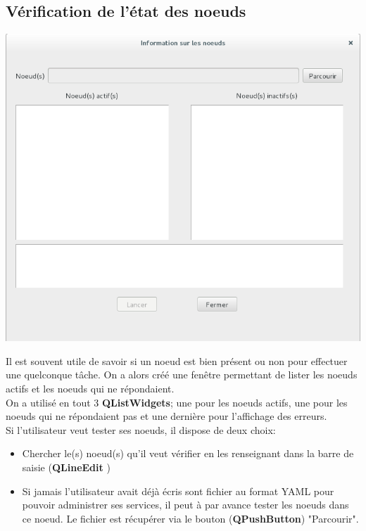 \documentclass[a4paper,11pt]{article}
\begin{document}
\subsection{Vérification de l'état des noeuds}

\begin{center}
\includegraphics[scale=0.6]{fen_etat_noeud.png} 
\end{center}

Il est souvent utile de savoir si un noeud est bien présent ou non pour effectuer une quelconque tâche. On a alors créé une fenêtre permettant de lister les noeuds actifs et les noeuds qui ne répondaient.\\
On a utilisé en tout 3 \textbf{QListWidgets}; une pour les noeuds actifs, une pour les noeuds qui ne répondaient pas et une dernière pour l'affichage des erreurs.\\
Si l'utilisateur veut tester ses noeuds, il dispose de deux choix:
\begin{itemize}
 \item Chercher le(s) noeud(s) qu'il veut vérifier en les renseignant dans la barre de saisie (\textbf{QLineEdit} )
 \item Si jamais l'utilisateur avait déjà écris sont fichier au format YAML pour pouvoir administrer ses services, il peut à par avance tester les noeuds dans ce noeud. Le fichier est récupérer via le bouton (\textbf{QPushButton}) "Parcourir".
 \end{itemize}
\end{document}
